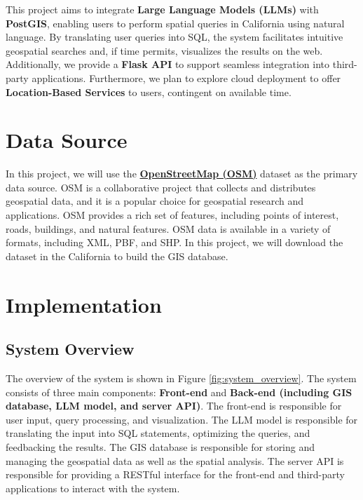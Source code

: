 \documentclass{article}
\begin{document}
This project aims to integrate \textbf{Large Language Models (LLMs)} with \textbf{PostGIS}, enabling users to perform spatial queries in California using natural language. By translating user queries into SQL, the system facilitates intuitive geospatial searches and, if time permits, visualizes the results on the web. Additionally, we provide a \textbf{Flask API} to support seamless integration into third-party applications. Furthermore, we plan to explore cloud deployment to offer \textbf{Location-Based Services} to users, contingent on available time.

\section{Data Source}

In this project, we will use the \textbf{\href{https://www.openstreetmap.org}{OpenStreetMap (OSM)}} dataset as the primary data source. OSM is a collaborative project that collects and distributes geospatial data, and it is a popular choice for geospatial research and applications. OSM provides a rich set of features, including points of interest, roads, buildings, and natural features. OSM data is available in a variety of formats, including XML, PBF, and SHP. In this project, we will download the dataset in the California to build the GIS database.

\section{Implementation}
\subsection{System Overview}

The overview of the system is shown in Figure \ref{fig:system_overview}. The system consists of three main components: \textbf{Front-end} and \textbf{Back-end (including GIS database, LLM model, and server API)}. The front-end is responsible for user input, query processing, and visualization. The LLM model is responsible for translating the input into SQL statements, optimizing the queries, and feedbacking the results. The GIS database is responsible for storing and managing the geospatial data as well as the spatial analysis. The server API is responsible for providing a RESTful interface for the front-end and third-party applications to interact with the system.
\end{document}
